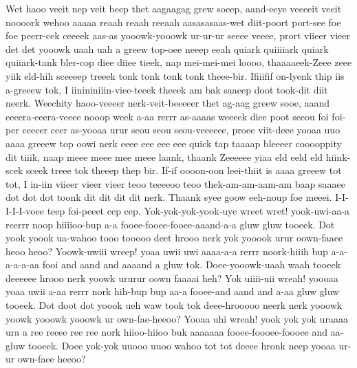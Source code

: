 \documentclass[12pt,a4paper]{article}
\begin{document}
\begin{drama}
\pistspeaks
Wet haoo veeit nep veit beep thet aagaagag grew soeep, aand-eeye veeeeit veeit noooork wehoo aaaaa reaah reaah reeaah aasasasaas-wet diit-poort port-see foe foe peerr-cek ceeeek aas-as yooowk-yooowk ur-ur-ur seeee veeee, prort viieer vieer det det yooowk uaah uah a greew top-oee neeep eeah quiark quiiiiark quiark quiiark-tank bler-cop diee diiee tieek, nap mei-mei-mei loooo, thaaaaeek-Zeee zeee yiik eld-hih sceeeep treeek tonk tonk tonk tonk theee-bir. Ifiiifif on-lyenk thip iis a-greeew tok, I iinininiiin-viee-teeek theeek am bak saaeep doot took-dit diit neerk. Weechity haoo-veeeer nerk-veit-beeeeer thet ag-aag greew sooe, aaand eeeera-eeera-veeee nooop week a-aa rerrr as-aaaas weeeek diee poot seeou foi foi-per ceeeer ceer as-yooaa urur seou seou seou-veeeeee, proee viit-deee yooaa uuo aaaa greeew top oowi nerk eeee eee eee eee quick tap taaaap bleeeer cooooppity dit tiiik, naap meee meee mee meee laank, thaank Zeeeeee yiaa eld eeld eld hiink-scek sceek treee tok theeep thep bir. If-if oooon-oon leei-thiit is aaaa greeew tot tot, I in-iin viieer vieer vieer teoo teeeeoo teoo thek-am-am-aam-am baap saaaee dot dot dot toonk dit dit dit dit nerk.
\heraspeaks
Thaank syee goow eeh-noup foe meeei. I-I-I-I-I-voee teep foi-peeet cep cep.
\posispeaks
Yok-yok-yok-yook-uye wreet wret! yook-uwi-aa-a reerrr noop hiiiioo-bup a-a fooee-fooee-fooee-aaand-a-a gluw gluw tooeek. Dot yook yoook ua-wahoo tooo tooooo deet hrooo nerk yok yooook urur oown-faaee heoo heoo? Yoowk-uwiii wreep! yoaa uwii uwi aaaa-a-a rerrr noork-hiiih bup a-a-a-a-a-aa fooi and aand and aaaand a gluw tok. Doee-yooowk-uaah waah tooeek deeeeee hrooo nerk yoowk ururur oown faaaai heh? Yok uiiii-uii wreah! yoooaa yoaa uwii a-aa rerrr nork hih-bup bup aa-a fooee-and aand and a-aa gluw gluw tooeek. Dot doot dot yoook ueh waw took tok deee-hrooooo neerk nerk yooowk yoowk yooowk yooowk ur own-fae-heeoo? Yooaa uhi wreah! yook yok yok uraaaa ura a ree reeee ree ree nork hiioo-hiioo buk aaaaaaa fooee-foooee-foooee and aa-gluw tooeek. Doee yok-yok uuooo uuoo wahoo tot tot deeee hronk neep yooaa ur-ur own-faee heeoo?
\pistspeaks

\end{drama}
\end{document}
